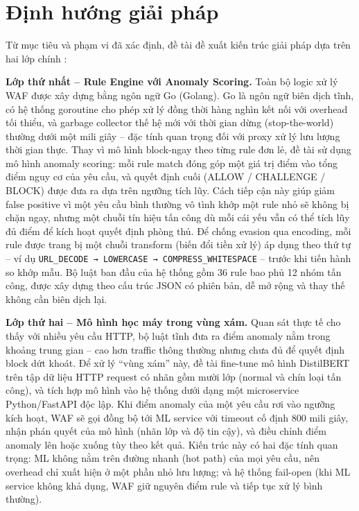 \documentclass[../DoAn.tex]{subfiles}
\begin{document}
\section{Định hướng giải pháp}
\label{section:1.3}

Từ mục tiêu và phạm vi đã xác định, đề tài đề xuất kiến trúc giải pháp dựa trên
hai lớp chính :

\textbf{Lớp thứ nhất -- Rule Engine với Anomaly Scoring.} Toàn bộ logic xử lý
WAF được xây dựng bằng ngôn ngữ Go (Golang). Go là ngôn ngữ biên dịch tĩnh,
có hệ thống goroutine cho phép xử lý đồng thời hàng nghìn kết nối với overhead
tối thiểu, và garbage collector thế hệ mới với thời gian dừng (stop-the-world)
thường dưới một mili giây -- đặc tính quan trọng đối với proxy xử lý lưu lượng
thời gian thực. Thay vì mô hình block-ngay theo từng rule đơn lẻ, đề tài sử dụng
mô hình anomaly scoring: mỗi rule match đóng góp một giá trị điểm vào tổng điểm
nguy cơ của yêu cầu, và quyết định cuối (ALLOW / CHALLENGE / BLOCK) được
đưa ra dựa trên ngưỡng tích lũy. Cách tiếp cận này giúp giảm false positive vì
một yêu cầu bình thường vô tình khớp một rule nhỏ sẽ không bị chặn ngay, nhưng
một chuỗi tín hiệu tấn công dù mỗi cái yếu vẫn có thể tích lũy đủ điểm để kích
hoạt quyết định phòng thủ. Để chống evasion qua encoding, mỗi rule được trang
bị một chuỗi transform (biến đổi tiền xử lý) áp dụng theo thứ tự -- ví dụ
\texttt{URL\_DECODE → LOWERCASE → COMPRESS\_WHITESPACE} -- trước
khi tiến hành so khớp mẫu. Bộ luật ban đầu của hệ thống gồm 36 rule bao phủ
12 nhóm tấn công, được xây dựng theo cấu trúc JSON có phiên bản, dễ mở rộng
và thay thế không cần biên dịch lại.

\textbf{Lớp thứ hai -- Mô hình học máy trong vùng xám.} Quan sát thực tế cho
thấy với nhiều yêu cầu HTTP, bộ luật tĩnh đưa ra điểm anomaly nằm trong khoảng
trung gian -- cao hơn traffic thông thường nhưng chưa đủ để quyết định block dứt
khoát. Để xử lý ``vùng xám'' này, đề tài fine-tune mô hình DistilBERT trên tập
dữ liệu HTTP request có nhãn gồm mười lớp (normal và chín loại tấn công), và
tích hợp mô hình vào hệ thống dưới dạng một microservice Python/FastAPI độc
lập. Khi điểm anomaly của một yêu cầu rơi vào ngưỡng kích hoạt, WAF sẽ gọi
đồng bộ tới ML service với timeout cố định 800 mili giây, nhận phán quyết của
mô hình (nhãn lớp và độ tin cậy), và điều chỉnh điểm anomaly lên hoặc xuống
tùy theo kết quả. Kiến trúc này có hai đặc tính quan trọng: ML không nằm trên
đường nhanh (hot path) của mọi yêu cầu, nên overhead chỉ xuất hiện ở một phần
nhỏ lưu lượng; và hệ thống fail-open (khi ML service không khả dụng, WAF giữ
nguyên điểm rule và tiếp tục xử lý bình thường).
\end{document}
